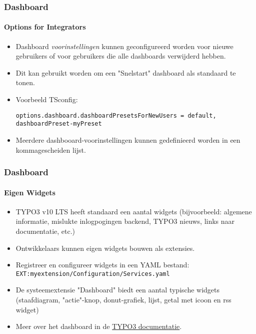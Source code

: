 
\begin{frame}[fragile]
	\frametitle{Dashboard}
	\framesubtitle{Options for Integrators}

	\lstset{basicstyle=\tiny\ttfamily}

	\begin{itemize}
		\item Dashboard \textit{voorinstellingen} kunnen geconfigureerd worden voor nieuwe gebruikers of voor gebruikers
			die alle dashboards verwijderd hebben.
		\item Dit kan gebruikt worden om een "Snelstart" dashboard als standaard te tonen.
		\item Voorbeeld TSconfig:

\vspace{-0.4cm}
\begin{lstlisting}
options.dashboard.dashboardPresetsForNewUsers = default, dashboardPreset-myPreset
\end{lstlisting}

		\item Meerdere dashbooard-voorinstellingen kunnen gedefinieerd worden in een kommagescheiden lijst.
	\end{itemize}

\end{frame}


\begin{frame}[fragile]
	\frametitle{Dashboard}
	\framesubtitle{Eigen Widgets}

	\begin{itemize}
		\item TYPO3 v10 LTS heeft standaard een aantal widgets\newline
			\smaller
				(bijvoorbeeld: algemene informatie, mislukte inlogpogingen backend, TYPO3 nieuws, links naar documentatie, etc.)
			\normalsize
		\item Ontwikkelaars kunnen eigen widgets bouwen als extensies.
		\item Registreer en configureer widgets in een YAML bestand:\newline
			\small
				\texttt{EXT:myextension/Configuration/Services.yaml}
			\normalsize
		\item De systeemextensie "Dashboard" biedt een aantal typische widgets\newline
			\smaller
				(staafdiagram, "actie"-knop, donut-grafiek, lijst, getal met icoon en rss widget)
			\normalsize
		\item Meer over het dashboard in de
			\href{https://docs.typo3.org/c/typo3/cms-dashboard/master/en-us/}{TYPO3 documentatie}.

	\end{itemize}

\end{frame}

